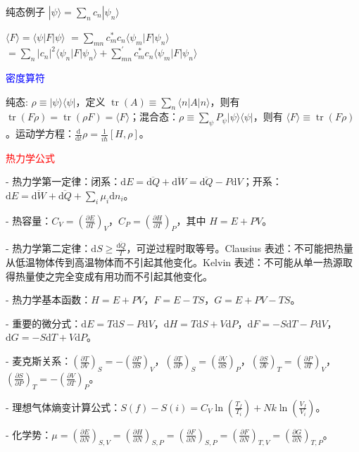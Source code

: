 \documentclass[a4paper,8pt]{extarticle} %
\newcommand{\bluetext}[1]{\textcolor{blue}{#1}}
\newcommand{\redtext}[1]{\textcolor{red}{#1}}
\begin{document}
\begin{multicols}{3}
纯态例子 $|\psi\rangle=\sum_{n}c_n|\psi_n\rangle$

$\langle F \rangle=\langle\psi|F|\psi\rangle$
$=\sum_{mn}c_m^*c_n\langle\psi_m|F|\psi_n\rangle$
$=\sum_n|c_n|^2\langle\psi_n|F|\psi_n\rangle+\sum_{mn}^\prime c_m^*c_n\langle\psi_m|F|\psi_n\rangle$

\bluetext{密度算符}

纯态: $\rho \equiv |\psi\rangle \langle\psi|$，定义 $\operatorname{tr}(A) \equiv \sum_{n}\langle n|A|n\rangle$，则有 $\operatorname{tr}(F\rho) = \operatorname{tr}(\rho F) = \langle F \rangle$；混合态：$\rho \equiv \sum_{\psi} P_{\psi}|\psi\rangle \langle\psi|$，则有 $\langle F \rangle \equiv \operatorname{tr}(F\rho)$。运动学方程：$\frac{\mathrm{d}}{\mathrm{d}t}\rho = \frac{1}{i\hbar}[H,\rho]$。

\redtext{热力学公式}

- 热力学第一定律：闭系：$\mathrm{d}E = \overline{\mathrm{d}Q} + \overline{\mathrm{d}W} = \overline{\mathrm{d}Q} - P\mathrm{d}V$；开系：$\mathrm{d}E = \overline{\mathrm{d}W} + \overline{\mathrm{d}Q} + \sum_i \mu_i\mathrm{d}n_i$。

- 热容量：$C_V = \left(\frac{\partial E}{\partial T}\right)_V$，$C_P = \left(\frac{\partial H}{\partial T}\right)_P$，其中 $H = E + PV$。

- 热力学第二定律：$\mathrm{d}S \geq \frac{\overline{\mathrm{d}Q}}{T}$，可逆过程时取等号。Clausius 表述：不可能把热量从低温物体传到高温物体而不引起其他变化。Kelvin 表述：不可能从单一热源取得热量使之完全变成有用功而不引起其他变化。

- 热力学基本函数：$H = E + PV$，$F = E - TS$，$G = E + PV - TS$。

- 重要的微分式：$\mathrm{d}E = T\mathrm{d}S-P\mathrm{d}V$，$\mathrm{d}H = T\mathrm{d}S+V\mathrm{d}P$，$\mathrm{d}F = -S\mathrm{d}T-P\mathrm{d}V$，$\mathrm{d}G = -S\mathrm{d}T + V\mathrm{d}P$。

- 麦克斯关系：$\left(\frac{\partial T}{\partial V}\right)_S = -\left(\frac{\partial P}{\partial S}\right)_V$，$\left(\frac{\partial T}{\partial P}\right)_S = \left(\frac{\partial V}{\partial S}\right)_P$，$\left(\frac{\partial S}{\partial V}\right)_T = \left(\frac{\partial P}{\partial T}\right)_V$，$\left(\frac{\partial S}{\partial P}\right)_T = -\left(\frac{\partial V}{\partial T}\right)_P$。

- 理想气体熵变计算公式：$S(f) - S(i) = C_V \ln\left(\frac{T_f}{T_i}\right) + Nk\ln\left(\frac{V_f}{V_i}\right)$。

- 化学势：$\mu = \left(\frac{\partial E}{\partial N}\right)_{S,V} = \left(\frac{\partial H}{\partial N}\right)_{S,P} = \left(\frac{\partial F}{\partial N}\right)_{S,P} = \left(\frac{\partial F}{\partial N}\right)_{T,V} = \left(\frac{\partial G}{\partial N}\right)_{T,P}$。


\end{multicols}
\end{document}
